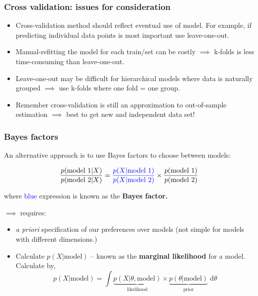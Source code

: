 \documentclass[handout]{beamer}
\begin{document}
\begin{frame}
	\frametitle{Cross validation: issues for consideration}
	
	\begin{itemize}
		\item<2-> Cross-validation method should reflect eventual use of model. For example, if predicting individual data points is most important use leave-one-out.
		\item<3-> Manual-refitting the model for each train/set can be costly $\implies$ k-folds is less time-consuming than leave-one-out.
		\item<4-> Leave-one-out may be difficult for hierarchical models where data is naturally grouped $\implies$ use k-folds where one fold = one group.
		\item<5-> Remember cross-validation is still an approximation to out-of-sample estimation $\implies$ best to get new and independent data set!
	\end{itemize}
	
\end{frame}

\begin{frame}
	\frametitle{Bayes factors}
	 An alternative approach is to use Bayes factors to choose between models:
	
	\begin{equation}
	\frac{p(\text{model 1}|X)}{p(\text{model 2}|X)} = \textcolor{blue}{\frac{p(X|\text{model 1})}{p(X|\text{model 2})}}\times \frac{p(\text{model 1})}{p(\text{model 2})}
	\end{equation}
	
	where \textcolor{blue}{blue} expression is known as the \textbf{Bayes factor.}
	
	$\implies$ requires:
	\begin{itemize}
		\item<5-> \textit{a priori} specification of our preferences over models (not simple for models with different dimensions.)
		\item<6-> Calculate $p(X|\text{model})$ -- known as the \textbf{marginal likelihood} for a model. \onslide<7-> Calculate by,
		\begin{equation}
		p(X|\text{model}) = \int \underbrace{p(X|\theta,\text{model})}_{\text{likelihood}} \times \underbrace{p(\theta|\text{model})}_{\text{prior}}\;\mathrm{d}\theta
		\end{equation}
	\end{itemize}
	
\end{frame}
\end{document}
